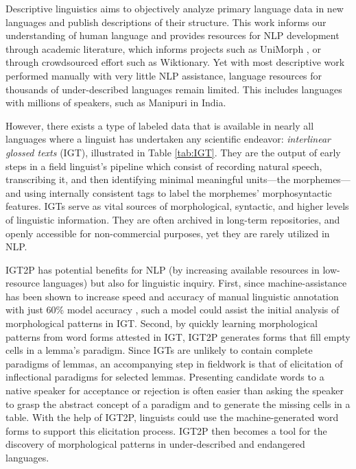 Descriptive linguistics aims to objectively analyze primary language data in new languages and publish descriptions of their structure. This work informs our understanding of human language and provides resources for NLP development through academic literature, which informs projects such as UniMorph \citep{kirov_unimorph}, or through crowdsourced effort such as Wiktionary. Yet with most descriptive work performed manually with very little NLP assistance, language resources for thousands of under-described languages remain limited. This includes languages with millions of speakers, such as Manipuri in India.

However, there exists a type of labeled data that is available in nearly all languages where a linguist has undertaken any scientific endeavor: \textit{interlinear glossed texts} (IGT), illustrated in Table \ref{tab:IGT}. They are the output of early steps in a field linguist's pipeline which consist of recording natural speech, transcribing it, and then identifying minimal meaningful units---the morphemes---and using internally consistent tags to label the morphemes' morphosyntactic features. IGTs serve as vital sources of morphological, syntactic, and higher levels of linguistic information. They are often archived in long-term repositories, and openly accessible for non-commercial purposes, yet they are rarely utilized in NLP.

IGT2P has potential benefits for NLP (by increasing available resources in low-resource languages) but also for linguistic inquiry. First, since machine-assistance has been shown to increase speed and accuracy of manual linguistic annotation with just 60\% model accuracy \citep{felt_improving_2012}, such a model could assist the initial analysis of morphological patterns in IGT. Second, by quickly learning morphological patterns from word forms attested in IGT, IGT2P generates forms that fill empty cells in a lemma's paradigm. Since IGTs are unlikely to contain complete paradigms of lemmas, an accompanying step in fieldwork is that of elicitation of inflectional paradigms for selected lemmas. Presenting candidate words to a native speaker for acceptance or rejection is often easier than asking the speaker to grasp the abstract concept of a paradigm and to generate the missing cells in a table. With the help of IGT2P, linguists could use the machine-generated word forms to support this elicitation process. IGT2P then becomes a tool for the discovery of morphological patterns in under-described and endangered languages.



